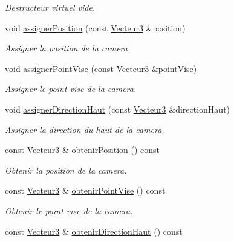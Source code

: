 \begin{DoxyCompactItemize}
\begin{DoxyCompactList}\small\item\em Destructeur virtuel vide. \end{DoxyCompactList}\item 
void \hyperlink{classvue_1_1_camera_aafd52e5bb78da96244421525058eef2f}{assigner\-Position} (const \hyperlink{group__utilitaire_ga541aa4837ad9250d3a248dc82ee9ad4d}{Vecteur3} \&position)
\begin{DoxyCompactList}\small\item\em Assigner la position de la camera. \end{DoxyCompactList}\item 
void \hyperlink{classvue_1_1_camera_a69846a87e30c5d8edb7929452836769b}{assigner\-Point\-Vise} (const \hyperlink{group__utilitaire_ga541aa4837ad9250d3a248dc82ee9ad4d}{Vecteur3} \&point\-Vise)
\begin{DoxyCompactList}\small\item\em Assigner le point vise de la camera. \end{DoxyCompactList}\item 
void \hyperlink{classvue_1_1_camera_a3b184e5951bb0a4acab80af4e2c50039}{assigner\-Direction\-Haut} (const \hyperlink{group__utilitaire_ga541aa4837ad9250d3a248dc82ee9ad4d}{Vecteur3} \&direction\-Haut)
\begin{DoxyCompactList}\small\item\em Assigner la direction du haut de la camera. \end{DoxyCompactList}\item 
const \hyperlink{group__utilitaire_ga541aa4837ad9250d3a248dc82ee9ad4d}{Vecteur3} \& \hyperlink{classvue_1_1_camera_a9e5aa2c77549dd8db47c2f249983d0ad}{obtenir\-Position} () const 
\begin{DoxyCompactList}\small\item\em Obtenir la position de la camera. \end{DoxyCompactList}\item 
const \hyperlink{group__utilitaire_ga541aa4837ad9250d3a248dc82ee9ad4d}{Vecteur3} \& \hyperlink{classvue_1_1_camera_a4c2e0079ea5ab132e2cca625a7854a09}{obtenir\-Point\-Vise} () const 
\begin{DoxyCompactList}\small\item\em Obtenir le point vise de la camera. \end{DoxyCompactList}\item 
const \hyperlink{group__utilitaire_ga541aa4837ad9250d3a248dc82ee9ad4d}{Vecteur3} \& \hyperlink{classvue_1_1_camera_adecce98a16454753431306e7b6ca4c75}{obtenir\-Direction\-Haut} () const 

\end{DoxyCompactItemize}
